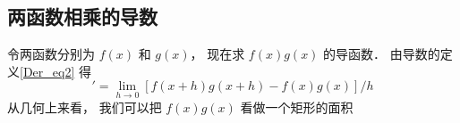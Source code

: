 \subsection{两函数相乘的导数}
令两函数分别为 $f(x)$ 和 $g(x)$， 现在求 $f(x) g(x)$ 的导函数． 由导数的定义\autoref{Der_eq2} 得
\begin{equation}
[f(x)g(x)]' = \lim_{h\to 0} [f(x+h)g(x+h) - f(x)g(x)]/h
\end{equation}
从几何上来看， 我们可以把 $f(x)g(x)$ 看做一个矩形的面积


















